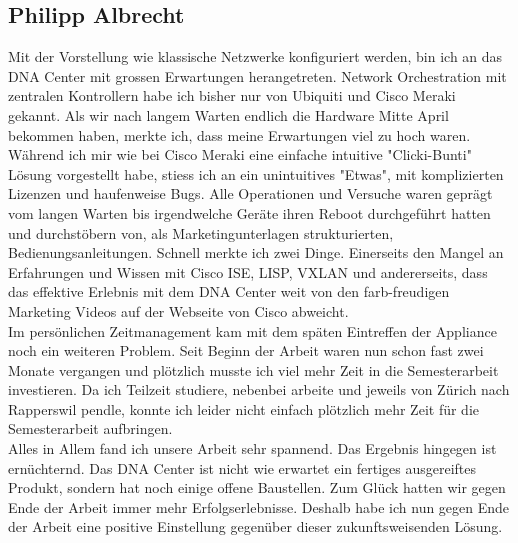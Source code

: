 \subsection{Philipp Albrecht}
Mit der Vorstellung wie klassische Netzwerke konfiguriert werden, bin ich an das DNA Center mit grossen Erwartungen herangetreten. Network Orchestration mit zentralen Kontrollern habe ich bisher nur von Ubiquiti und Cisco Meraki gekannt. Als wir nach langem Warten endlich die Hardware Mitte April bekommen haben, merkte ich, dass meine Erwartungen viel zu hoch waren. Während ich mir wie bei Cisco Meraki eine einfache intuitive "Clicki-Bunti" Lösung vorgestellt habe, stiess ich an ein unintuitives "Etwas", mit komplizierten Lizenzen und haufenweise Bugs. Alle Operationen und Versuche waren geprägt vom langen Warten bis irgendwelche Geräte ihren Reboot durchgeführt hatten und durchstöbern von, als Marketingunterlagen strukturierten, Bedienungsanleitungen. Schnell merkte ich zwei Dinge. Einerseits den Mangel an Erfahrungen und Wissen mit Cisco ISE, LISP, VXLAN und andererseits, dass das effektive Erlebnis mit dem DNA Center weit von den farb-freudigen Marketing Videos auf der Webseite von Cisco abweicht. \\
Im persönlichen Zeitmanagement kam mit dem späten Eintreffen der Appliance noch ein weiteren Problem. Seit Beginn der Arbeit waren nun schon fast zwei Monate vergangen und plötzlich musste ich viel mehr Zeit in die Semesterarbeit investieren. Da ich Teilzeit studiere, nebenbei arbeite und jeweils von Zürich nach Rapperswil pendle, konnte ich leider nicht einfach plötzlich mehr Zeit für die Semesterarbeit aufbringen. \\
Alles in Allem fand ich unsere Arbeit sehr spannend. Das Ergebnis hingegen ist ernüchternd. Das DNA Center ist nicht wie erwartet ein fertiges ausgereiftes Produkt, sondern hat noch einige offene Baustellen. Zum Glück hatten wir gegen Ende der Arbeit immer mehr Erfolgserlebnisse. Deshalb habe ich nun gegen Ende der Arbeit eine positive Einstellung gegenüber dieser zukunftsweisenden Lösung.

